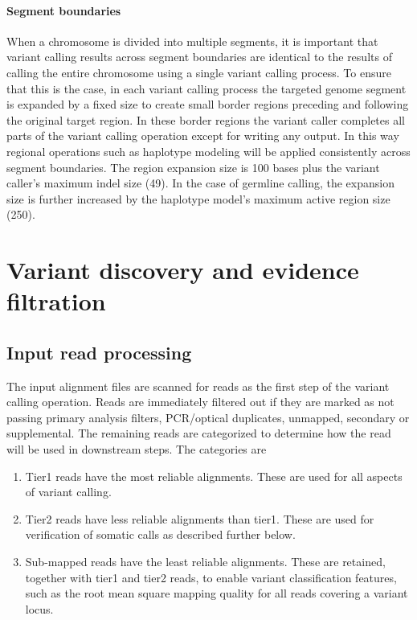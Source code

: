 \documentclass{article}
\begin{document}
\paragraph{Segment boundaries} When a chromosome is divided into multiple segments, it is important that variant calling results across segment boundaries are identical to the results of calling the entire chromosome using a single variant calling process. To ensure that this is the case, in each variant calling process the targeted genome segment is expanded by a fixed size to create small border regions preceding and following the original target region. In these border regions the variant caller completes all parts of the variant calling operation except for writing any output. In this way regional operations such as haplotype modeling will be applied consistently across segment boundaries. The region expansion size is 100 bases plus the variant caller's maximum indel size (49). In the case of germline calling, the expansion size is further increased by the haplotype model's maximum active region size (250).


\section{Variant discovery and evidence filtration}

\subsection{Input read processing}

The input alignment files are scanned for reads as the first step of the variant calling operation. Reads are immediately filtered out if they are marked as not passing primary analysis filters, PCR/optical duplicates, unmapped, secondary or supplemental. The remaining reads are categorized to determine how the read will be used in downstream steps. The categories are
\begin{enumerate}
    \item Tier1 reads have the most reliable alignments. These are used for all aspects of variant calling.
    \item Tier2 reads have less reliable alignments than tier1. These are used for verification of somatic calls as described further below.
    \item Sub-mapped reads have the least reliable alignments. These are retained, together with tier1 and tier2 reads, to enable  variant classification features, such as the root mean square mapping quality for all reads covering a variant locus.
\end{enumerate}
\end{document}
